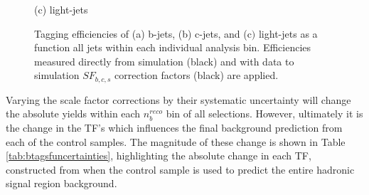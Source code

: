 \begin{figure}[ht]
\begin{minipage}[b]{0.48\linewidth}
\centering (c) light-jets
\end{minipage}
\caption[Tagging efficiencies of (a) b-jets, (b) c-jets, and (c$)$ light-jets determined from all jets within each individual analysis \theht bin. ]{Tagging efficiencies of (a) b-jets, (b) c-jets, and (c$)$ light-jets as a function all jets within each individual analysis \theht bin. Efficiencies measured directly from simulation (black) and with data to simulation $SF_{b,c,s}$ correction factors (black) are applied.}\label{fig:btagefficiency}
\end{figure}



Varying the scale factor corrections by their systematic uncertainty will change the absolute yields within  each $n_{b}^{reco}$ bin of all selections. However, ultimately it is the change in the \ac{TF}'s which influences the final background prediction from each of the control samples. The magnitude of these change is shown in Table \ref{tab:btagsfuncertainties}, highlighting the absolute change in each \ac{TF}, constructed from when the \mupjets control sample is used to predict the entire hadronic signal region background. 


